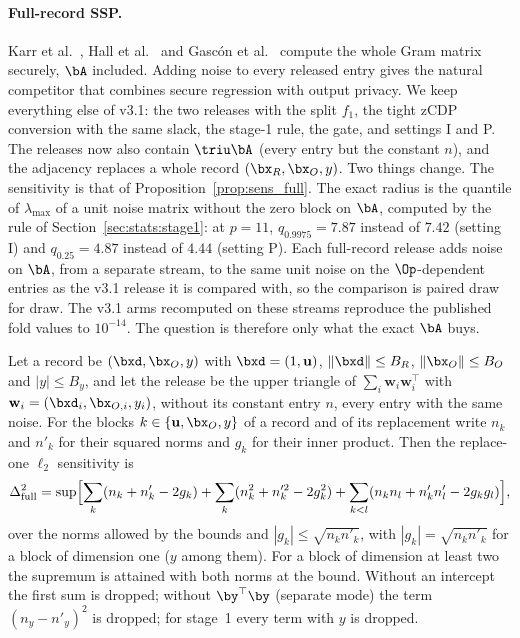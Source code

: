 \paragraph{Full-record SSP.} Karr et al.~\cite{karr2009privacy}, Hall et al.~\cite{hall2011secure} and Gasc\'on et al.~\cite{gascon2017privacy} compute the whole Gram matrix securely, $\bA$ included. Adding noise to every released entry gives the natural competitor that combines secure regression with output privacy. We keep everything else of v3.1: the two releases with the split $f_1$, the tight zCDP conversion with the same slack, the stage-1 rule, the gate, and settings I and P. The releases now also contain $\triu\bA$ (every entry but the constant $n$), and the adjacency replaces a whole record $(\bx_R, \bx_O, y)$. Two things change. The sensitivity is that of Proposition~\ref{prop:sens_full}. The exact radius is the quantile of $\lambda_{\max}$ of a unit noise matrix without the zero block on $\bA$, computed by the rule of Section~\ref{sec:stats:stage1}: at $p = 11$, $q_{0.9975} = 7.87$ instead of $7.42$ (setting I) and $q_{0.25} = 4.87$ instead of $4.44$ (setting P). Each full-record release adds noise on $\bA$, from a separate stream, to the same unit noise on the $\Op$-dependent entries as the v3.1 release it is compared with, so the comparison is paired draw for draw. The v3.1 arms recomputed on these streams reproduce the published fold values to $10^{-14}$. The question is therefore only what the exact $\bA$ buys.

\begin{proposition}
\label{prop:sens_full}
Let a record be $(\bxd, \bx_O, y)$ with $\bxd = (1, \mathbf u)$, $\|\bxd\| \le B_R$, $\|\bx_O\| \le B_O$ and $|y| \le B_y$, and let the release be the upper triangle of $\sum_i \mathbf w_i\mathbf w_i^\top$ with $\mathbf w_i = (\bxd_i, \bx_{O,i}, y_i)$, without its constant entry $n$, every entry with the same noise. For the blocks $k \in \{\mathbf u, \bx_O, y\}$ of a record and of its replacement write $n_k$ and $n'_k$ for their squared norms and $g_k$ for their inner product. Then the replace-one $\ell_2$ sensitivity is
\begin{equation}
  \Delta_{\mathrm{full}}^2 = \sup\Bigl[\sum_k (n_k + n'_k - 2g_k) + \sum_k (n_k^2 + n_k'^2 - 2g_k^2) + \sum_{k < l} (n_k n_l + n'_k n'_l - 2g_k g_l)\Bigr],
  \label{eq:sens_full}
\end{equation}
over the norms allowed by the bounds and $|g_k| \le \sqrt{n_k n'_k}$, with $|g_k| = \sqrt{n_k n'_k}$ for a block of dimension one ($y$ among them). For a block of dimension at least two the supremum is attained with both norms at the bound. Without an intercept the first sum is dropped; without $\by^\top\by$ (separate mode) the term $(n_y - n'_y)^2$ is dropped; for stage~1 every term with $y$ is dropped.
\end{proposition}

